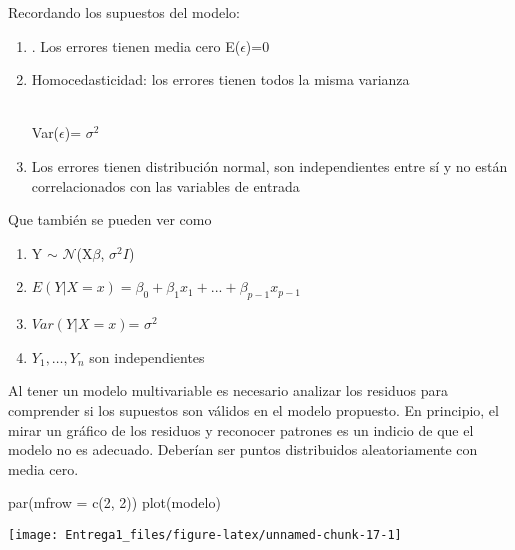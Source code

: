 \documentclass[
]{article}
\newenvironment{Shaded}{\begin{snugshade}}{\end{snugshade}}
\newcommand{\AttributeTok}[1]{\textcolor[rgb]{0.77,0.63,0.00}{#1}}
\newcommand{\CommentTok}[1]{\textcolor[rgb]{0.56,0.35,0.01}{\textit{#1}}}
\newcommand{\DecValTok}[1]{\textcolor[rgb]{0.00,0.00,0.81}{#1}}
\newcommand{\FunctionTok}[1]{\textcolor[rgb]{0.00,0.00,0.00}{#1}}
\newcommand{\NormalTok}[1]{#1}
\begin{document}
Recordando los supuestos del modelo:

\begin{enumerate}
\def\labelenumi{\arabic{enumi}.}
\item
  . Los errores tienen media cero E(\(\epsilon\))=0
\item
  Homocedasticidad: los errores tienen todos la misma varianza\\
  \strut \\
  Var(\(\epsilon\))= \(\sigma^2\)
\item
  Los errores tienen distribución normal, son independientes entre sí y
  no están correlacionados con las variables de entrada
\end{enumerate}

Que también se pueden ver como

\begin{enumerate}
\def\labelenumi{\arabic{enumi}.}
\item
  Y \(\sim\) \(\mathcal{N}\)(X\(\beta\), \(\sigma^2I\))
\item
  \(E(Y|X=x)= \beta_0+\beta_1x_1+...+\beta_{p-1}x_{p-1}\)
\item
  \(Var(Y|X=x)\)= \(\sigma^2\)
\item
  \(Y_{1}, \ldots, Y_{n}\) son independientes
\end{enumerate}

Al tener un modelo multivariable es necesario analizar los residuos para
comprender si los supuestos son válidos en el modelo propuesto. En
principio, el mirar un gráfico de los residuos y reconocer patrones es
un indicio de que el modelo no es adecuado. Deberían ser puntos
distribuidos aleatoriamente con media cero.

\begin{Shaded}
\begin{Highlighting}[]
\FunctionTok{par}\NormalTok{(}\AttributeTok{mfrow =} \FunctionTok{c}\NormalTok{(}\DecValTok{2}\NormalTok{, }\DecValTok{2}\NormalTok{))}
\FunctionTok{plot}\NormalTok{(modelo)}
\end{Highlighting}
\end{Shaded}

\begin{center}\texttt{[image: Entrega1\_files/figure-latex/unnamed-chunk-17-1]} \end{center}

\begin{Shaded}
\end{Shaded}
\end{document}
